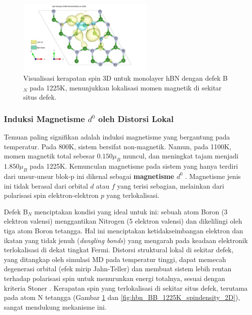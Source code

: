\begin{figure}[h!]
    \centering
    \includegraphics[width=0.6\textwidth]{gambar_hasil/hBN_spin_BB_1225K.png}
    \caption{Visualisasi kerapatan spin 3D untuk monolayer hBN dengan defek B$_N$ pada 1225K, menunjukkan lokalisasi momen magnetik di sekitar situs defek.}
    \label{fig:hbn_BB_1225K_spindensity}
\end{figure}

\subsubsection{Induksi Magnetisme $d^0$ oleh Distorsi Lokal}
Temuan paling signifikan adalah induksi magnetisme yang bergantung pada temperatur. Pada 800K, sistem bersifat non-magnetik. Namun, pada 1100K, momen magnetik total sebesar $0.150 \mu_B$ muncul, dan meningkat tajam menjadi $1.850 \mu_B$ pada 1225K. Kemunculan magnetisme pada sistem yang hanya terdiri dari unsur-unsur blok-p ini dikenal sebagai \textbf{magnetisme $d^0$} \citep{zhou2019}. Magnetisme jenis ini tidak berasal dari orbital $d$ atau $f$ yang terisi sebagian, melainkan dari polarisasi spin elektron-elektron $p$ yang terlokalisasi.

Defek B$_N$ menciptakan kondisi yang ideal untuk ini: sebuah atom Boron (3 elektron valensi) menggantikan Nitrogen (5 elektron valensi) dan dikelilingi oleh tiga atom Boron tetangga. Hal ini menciptakan ketidakseimbangan elektron dan ikatan yang tidak jenuh (\textit{dangling bonds}) yang mengarah pada keadaan elektronik terlokalisasi di dekat tingkat Fermi. Distorsi struktural lokal di sekitar defek, yang ditangkap oleh simulasi MD pada temperatur tinggi, dapat memecah degenerasi orbital (efek mirip Jahn-Teller) dan membuat sistem lebih rentan terhadap polarisasi spin untuk menurunkan energi totalnya, sesuai dengan kriteria Stoner \citep{Zhu2011}. Kerapatan spin yang terlokalisasi di sekitar situs defek, terutama pada atom N tetangga (Gambar \ref{fig:hbn_BB_1225K_spindensity} dan \ref{fig:hbn_BB_1225K_spindensity_2D}), sangat mendukung mekanisme ini.

